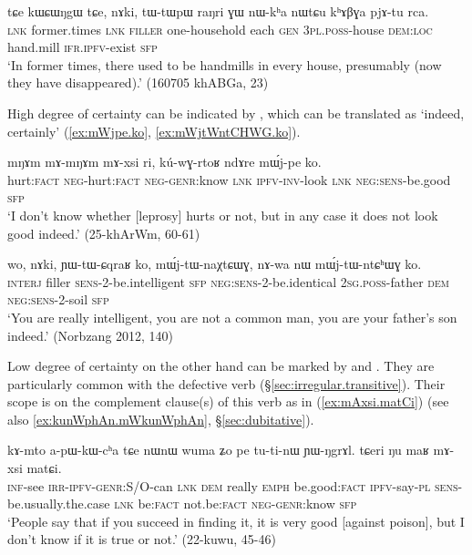 \begin{exe} 
\ex \label{ex:pjAtu.rca}
\gll  tɕe kɯɕɯŋgɯ tɕe, nɤki, tɯ-tɯpɯ raŋri ɣɯ nɯ-kʰa nɯtɕu kʰɤβɣa pjɤ-tu rca. \\
\textsc{lnk} former.times \textsc{lnk} \textsc{filler} one-household each \textsc{gen} \textsc{3pl}.\textsc{poss}-house \textsc{dem}:\textsc{loc} hand.mill \textsc{ifr}.\textsc{ipfv}-exist \textsc{sfp} \\
\glt `In former times, there used to be handmills in every house, presumably (now they have disappeared).' (160705 khABGa, 23)
\end{exe} 

High degree of certainty can be indicated by , which can be translated as `indeed, certainly' (\ref{ex:mWjpe.ko}, \ref{ex:mWjtWntCHWG.ko}).
 
\begin{exe} 
\ex \label{ex:mWjpe.ko}
\gll  mŋɤm mɤ-mŋɤm mɤ-xsi ri, kú-wɣ-rtoʁ ndɤre mɯ́j-pe ko. \\
hurt:\textsc{fact} \textsc{neg}-hurt:\textsc{fact} \textsc{neg}-\textsc{genr}:know \textsc{lnk} \textsc{ipfv}-\textsc{inv}-look \textsc{lnk} \textsc{neg}:\textsc{sens}-be.good \textsc{sfp} \\
\glt `I don't know whether [leprosy] hurts or not, but in any case it does not look good indeed.' (25-khArWm, 60-61)
\end{exe} 

\begin{exe} 
\ex \label{ex:mWjtWntCHWG.ko}
\gll wo, nɤki, ɲɯ-tɯ-ɕqraʁ ko, mɯ́j-tɯ-naχtɕɯɣ, nɤ-wa nɯ mɯ́j-tɯ-ntɕʰɯɣ ko. \\
\textsc{interj} filler \textsc{sens}-2-be.intelligent \textsc{sfp} \textsc{neg}:\textsc{sens}-2-be.identical \textsc{2sg}.\textsc{poss}-father \textsc{dem} \textsc{neg}:\textsc{sens}-2-soil \textsc{sfp} \\ 
\glt  `You are really intelligent, you are not a common man, you are your father's son indeed.' (Norbzang 2012, 140)
\end{exe} 

Low degree of certainty on the other hand can be marked by   and . They are particularly common with the defective verb  (§\ref{sec:irregular.transitive}). Their scope is on the complement clause(s) of this verb as in (\ref{ex:mAxsi.matCi}) (see also \ref{ex:kunWphAn.mWkunWphAn}, §\ref{sec:dubitative}). 

\begin{exe} 
\ex \label{ex:mAxsi.matCi}
\gll  kɤ-mto a-pɯ-kɯ-cʰa tɕe nɯnɯ wuma ʑo pe tu-ti-nɯ ɲɯ-ŋgrɤl.
tɕeri ŋu maʁ mɤ-xsi matɕi. \\
\textsc{inf}-see \textsc{irr}-\textsc{ipfv}-\textsc{genr}:S/O-can \textsc{lnk} \textsc{dem} really \textsc{emph} be.good:\textsc{fact} \textsc{ipfv}-say-\textsc{pl} \textsc{sens}-be.usually.the.case \textsc{lnk} be:\textsc{fact} not.be:\textsc{fact} \textsc{neg}-\textsc{genr}:know \textsc{sfp} \\
\glt `People say that if you succeed in finding it, it is very good [against poison], but I don't know if it is true or not.' (22-kuwu, 45-46)
\end{exe} 
 
